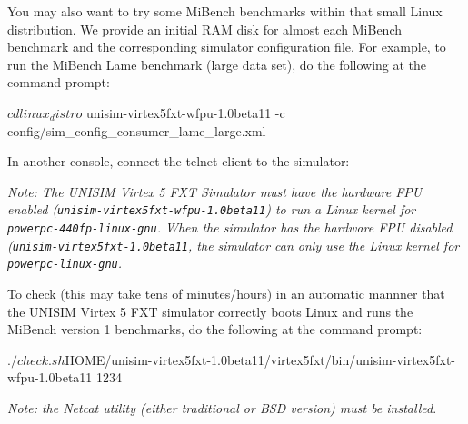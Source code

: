You may also want to try some MiBench benchmarks within that small Linux distribution.
We provide an initial RAM disk for almost each MiBench benchmark and the corresponding simulator configuration file.
\noindent For example, to run the MiBench Lame benchmark (large data set), do the following at the command prompt:

\begin{script}
   $ cd linux_distro
   $ unisim-virtex5fxt-wfpu-1.0beta11 -c config/sim_config_consumer_lame_large.xml
\end{script}

\noindent In another console, connect the telnet client to the simulator:

\textit{Note: The UNISIM Virtex 5 FXT Simulator must have the hardware FPU enabled (\texttt{unisim\--virtex5fxt\--wfpu\--1.0beta11}) to run a Linux kernel for \texttt{powerpc\--440fp\--linux\--gnu}.
When the simulator has the hardware FPU disabled (\texttt{unisim\--virtex5fxt\--1.0beta11}, the simulator can only use the Linux kernel for \texttt{powerpc\--linux\--gnu}.}

To check (this may take tens of minutes/hours) in an automatic mannner that the UNISIM Virtex 5 FXT simulator correctly boots Linux and runs the MiBench version 1 benchmarks, do the following at the command prompt:
\begin{script}
   $ ./check.sh ${HOME}/unisim-virtex5fxt-1.0beta11/virtex5fxt/bin/unisim-virtex5fxt-wfpu-1.0beta11 1234
\end{script}
\textit{Note: the Netcat utility (either traditional or BSD version) must be installed}.

